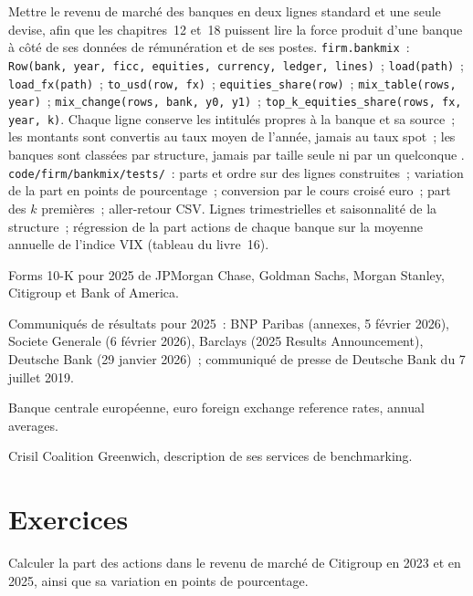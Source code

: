 \begin{build}
 Mettre le revenu de marché des banques en deux lignes standard et une seule devise, afin que les chapitres~12 et~18 puissent lire la force produit d'une
banque à côté de ses données de rémunération et de ses postes.
 \texttt{firm.bankmix}~: \texttt{Row(bank, year, ficc, equities, currency, ledger, lines)}~;
\texttt{load(path)}~; \texttt{load\_fx(path)}~; \texttt{to\_usd(row, fx)}~; \texttt{equities\_share(row)}~;
\texttt{mix\_table(rows, year)}~; \texttt{mix\_change(rows, bank, y0, y1)}~; \texttt{top\_k\_equities\_share(rows, fx, year, k)}.
 Chaque ligne conserve les intitulés propres à la banque et sa source~; les montants sont convertis au taux moyen de l'année,
jamais au taux spot~; les banques sont classées par structure, jamais par taille seule ni par un quelconque .
 \texttt{code/firm/bankmix/tests/}~: parts et ordre sur des lignes construites~; variation de la part en points de pourcentage~;
conversion par le cours croisé euro~; part des $k$ premières~; aller-retour CSV.
 Lignes trimestrielles et saisonnalité de la structure~; régression de la part actions de chaque banque sur la moyenne annuelle
de l'indice VIX (tableau du livre~16).
\end{build}

\begin{omsources}
\item Forms 10-K pour 2025 de JPMorgan Chase, Goldman Sachs, Morgan Stanley, Citigroup et Bank of America.
\item Communiqués de résultats pour 2025~: BNP Paribas (annexes, 5 février 2026), Societe Generale (6 février 2026), Barclays
(2025 Results Announcement), Deutsche Bank (29 janvier 2026)~; communiqué de presse de Deutsche Bank du 7 juillet 2019.
\item Banque centrale européenne, euro foreign exchange reference rates, annual averages.
\item Crisil Coalition Greenwich, description de ses services de benchmarking.
\end{omsources}

\section{Exercices}

\begin{exercise}[$\star$]\label{exo:in:bank-markets-divisions:1}
Calculer la part des actions dans le revenu de marché de Citigroup en 2023 et en 2025, ainsi que sa variation en points de pourcentage.
\end{exercise}

